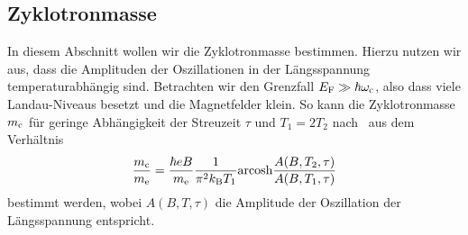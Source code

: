 \documentclass[paper=a4,fontsize=10pt,DIV=18,twocolumn,parskip=half]{scrartcl}
\numberwithin{equation}{section}    %
\begin{document}
\subsection{Zyklotronmasse}
\label{a4}

In diesem Abschnitt wollen wir die Zyklotronmasse bestimmen. Hierzu nutzen wir aus, dass die Amplituden der Oszillationen in der Längsspannung temperaturabhängig sind. Betrachten wir den Grenzfall $E_{\rm F} \gg \hbar\omega_{\rm c}$, also dass viele Landau-Niveaus besetzt und die Magnetfelder klein. So kann die Zyklotronmasse $m_{\rm c}$ für geringe Abhängigkeit der Streuzeit $\tau$ und $T_{1} = 2T_{2}$ nach~\citet{ando} aus dem Verhältnis
\begin{equation}
	\frac{m_{\rm c}}{m_{\rm e}} = \frac{\hbar e B}{m_{\rm e}} \frac{1}{\pi^2 k_{\rm B} T_{1}}\mathrm{arcosh}\frac{A(B,T_2,\tau)}{A(B,T_1,\tau)}
	\label{eq:zyklotronmasse}
\end{equation}
bestimmt werden, wobei $A(B,T,\tau)$ die Amplitude der Oszillation der Längsspannung entspricht.
\end{document}
